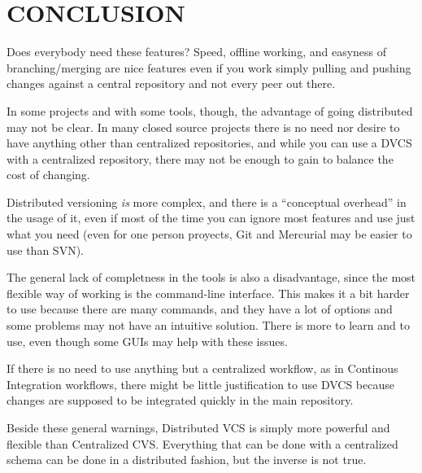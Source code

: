 \section{CONCLUSION}

Does everybody need these features? Speed, offline working, 
and easyness of branching/merging are nice features even if you work simply pulling 
and pushing changes against a central repository and not every peer out there. 

In some 
projects and with some tools, though, the advantage of going distributed may not be clear. 
In many closed source projects there is no need nor desire to have anything
other than centralized repositories, and while you can use a DVCS with a centralized
repository, there may not be enough to gain to balance the cost of changing. 

Distributed versioning \emph{is} more complex, and there is a ``conceptual overhead'' in the usage 
of it, even if most of the time you can ignore most features and use just what you need 
(even for one person proyects, Git and Mercurial may be easier to use than SVN).

The general lack of completness in the tools is also a disadvantage, since the most flexible
way of working is the command-line interface. This makes it a bit harder to use because there 
are many commands, and they have a lot of options and some problems may not have an intuitive 
solution. There is more to learn and to use, even though some GUIs may help with these issues.

If there is no need to use anything but a centralized workflow, as in Continous Integration 
workflows, there might be little justification to use DVCS because changes are supposed to be 
integrated quickly in the main repository.

Beside these general warnings, Distributed VCS is simply more powerful and flexible than Centralized CVS.
Everything that can be done with a centralized schema can be done in a distributed fashion, but the inverse
is not true. 



